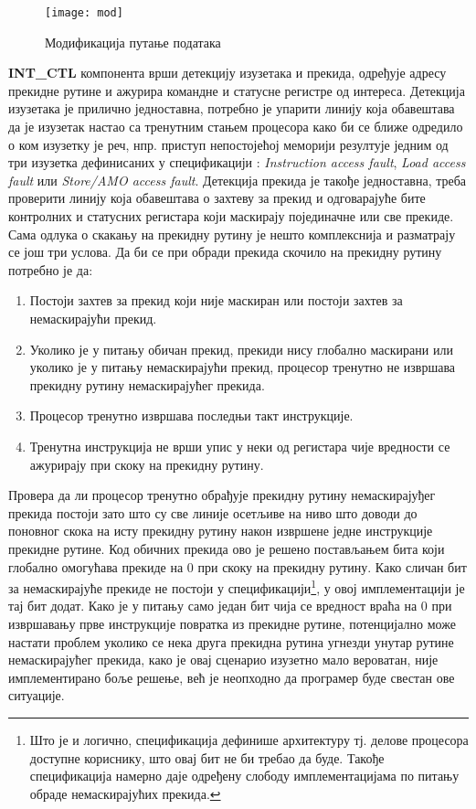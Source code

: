 \begin{wrapfigure}{l}{0.5\textwidth}
	\centering
	\texttt{[image: mod]}
	\caption{Модификација путање података}
	\label{fig:mod}
\end{wrapfigure}

\textbf{INT\_CTL} компонента врши детекцију изузетака и прекида, одређује адресу прекидне рутине и ажурира командне и статусне регистре од интереса.
Детекција изузетака је прилично једноставна, потребно је упарити линију која обавештава да је изузетак настао са тренутним стањем процесора како би се ближе одредило о ком изузетку је реч, нпр. приступ непостојећој меморији резултује једним од три изузетка дефинисаних у спецификацији \cite{priv_spec}: \textit{Instruction access fault}, \textit{Load access fault} или \textit{Store/AMO access fault}. Детекција прекида је такође једноставна, треба проверити линију која обавештава о захтеву за прекид и одговарајуће бите контролних и статусних регистара који маскирају појединачне или све прекиде. Сама одлука о скакању на прекидну рутину је нешто комплекснија и разматрају се још три услова. Да би се при обради прекида скочило на прекидну рутину потребно је да:
\begin{enumerate}
	\item Постоји захтев за прекид који није маскиран или постоји захтев за немаскирајући прекид.
	\item Уколико је у питању обичан прекид, прекиди нису глобално маскирани или уколико је у питању немаскирајући прекид, процесор тренутно не извршава прекидну рутину немаскирајућег прекида.
	\item Процесор тренутно извршава последњи такт инструкције.
	\item Тренутна инструкција не врши упис у неки од регистара чије вредности се ажурирају при скоку на прекидну рутину.
\end{enumerate}

Провера да ли процесор тренутно обрађује прекидну рутину немаскирајуђег прекида постоји зато што су све линије осетљиве на ниво што доводи до поновног скока на исту прекидну рутину након извршене једне инструкције прекидне рутине. Код обичних прекида ово је решено постављањем бита који глобално омогућава прекиде на 0 при скоку на прекидну рутину. Како сличан бит за немаскирајуће прекиде не постоји у спецификацији\footnote{Што је и логично, спецификација дефинише архитектуру тј. делове процесора доступне кориснику, што овај бит не би требао да буде. Такође спецификација намерно даје одређену слободу имплементацијама по питању обраде немаскирајућих прекида.}, у овој имплементацији је тај бит додат. Како је у питању само један бит чија се вредност враћа на 0 при извршавању прве инструкције повратка из прекидне рутине, потенцијално може настати проблем уколико се нека друга прекидна рутина угнезди унутар рутине немаскирајућег прекида, како је овај сценарио изузетно мало вероватан, није имплементирано боље решење, већ је неопходно да програмер буде свестан ове ситуације.

